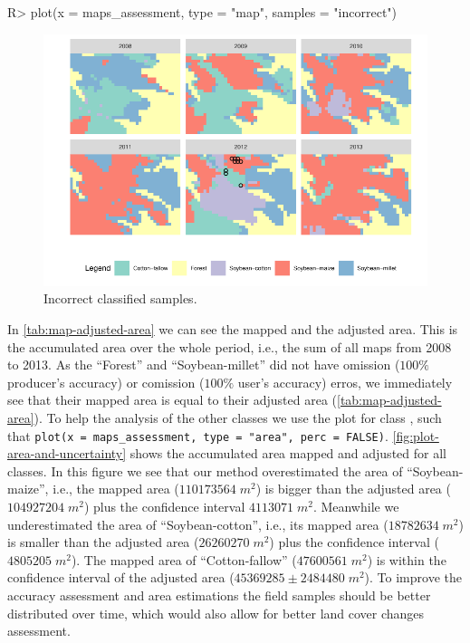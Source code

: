 \documentclass[article,shortnames]{jss}
\begin{document}
\begin{CodeChunk}

\begin{CodeInput}
R> plot(x = maps_assessment, type = "map", samples = "incorrect")
\end{CodeInput}
\begin{figure}[!ht]

{\centering \includegraphics{dtwSat_files/figure-latex/plot-map-incorrect-samples-1} 

}

\caption[Incorrect classified samples]{Incorrect classified samples.}\label{fig:plot-map-incorrect-samples}
\end{figure}
\end{CodeChunk}

\newpage

In \autoref{tab:map-adjusted-area} we can see the mapped and the
adjusted area. This is the accumulated area over the whole period, i.e.,
the sum of all maps from 2008 to 2013. As the ``Forest'' and
``Soybean-millet'' did not have omission (\(100\%\) producer's accuracy)
or comission (\(100\%\) user's accuracy) erros, we immediately see that
their mapped area is equal to their adjusted area
(\autoref{tab:map-adjusted-area}). To help the analysis of the other
classes we use the plot  for class
, such that
\texttt{plot(x\ =\ maps\_assessment,\ type\ =\ "area",\ perc\ =\ FALSE)}.
\autoref{fig:plot-area-and-uncertainty} shows the accumulated area
mapped and adjusted for all classes. In this figure we see that our
method overestimated the area of ``Soybean-maize'', i.e., the mapped
area (\(110173564\;m^2\)) is bigger than the adjusted area
(\(104927204\;m^2\)) plus the confidence interval \(4113071\;m^2\).
Meanwhile we underestimated the area of ``Soybean-cotton'', i.e., its
mapped area (\(18782634\;m^2\)) is smaller than the adjusted area
(\(26260270\;m^2\)) plus the confidence interval (\(4805205\;m^2\)). The
mapped area of ``Cotton-fallow'' (\(47600561\;m^2\)) is within the
confidence interval of the adjusted area (\(45369285\pm2484480\;m^2\)).
To improve the accuracy assessment and area estimations the field
samples should be better distributed over time, which would also allow
for better land cover changes assessment.
\end{document}
